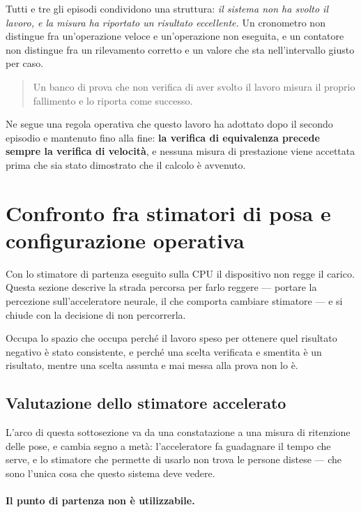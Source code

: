 Tutti e tre gli episodi condividono una struttura: \emph{il sistema non ha svolto il lavoro, e la misura ha riportato un risultato eccellente.} Un cronometro non distingue fra un'operazione veloce e un'operazione non eseguita, e un contatore non distingue fra un rilevamento corretto e un valore che sta nell'intervallo giusto per caso.

\begin{quote}
Un banco di prova che non verifica di aver svolto il lavoro misura il proprio fallimento e lo riporta come successo.
\end{quote}

Ne segue una regola operativa che questo lavoro ha adottato dopo il secondo episodio e mantenuto fino alla fine: \textbf{la verifica di equivalenza precede sempre la verifica di velocità}, e nessuna misura di prestazione viene accettata prima che sia stato dimostrato che il calcolo è avvenuto.

\section{Confronto fra stimatori di posa e configurazione operativa}
\label{sec:npu}

Con lo stimatore di partenza eseguito sulla CPU il dispositivo non regge il carico. Questa sezione descrive la strada percorsa per farlo reggere --- portare la percezione sull'acceleratore neurale, il che comporta cambiare stimatore --- e si chiude con la decisione di non percorrerla.

Occupa lo spazio che occupa perché il lavoro speso per ottenere quel risultato negativo è stato consistente, e perché una scelta verificata e smentita è un risultato, mentre una scelta assunta e mai messa alla prova non lo è.

\subsection{Valutazione dello stimatore accelerato}

L'arco di questa sottosezione va da una constatazione a una misura di ritenzione delle pose, e cambia segno a metà: l'acceleratore fa guadagnare il tempo che serve, e lo stimatore che permette di usarlo non trova le persone distese --- che sono l'unica cosa che questo sistema deve vedere.

\paragraph{Il punto di partenza non è utilizzabile.}

